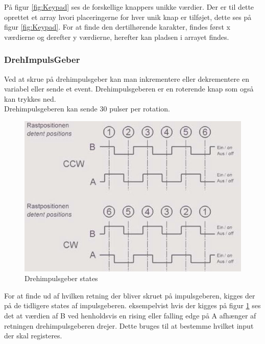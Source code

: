 På figur \ref{fig:Keypad} ses de forskellige knappers unikke værdier. Der er til dette oprettet et array hvori placeringerne for hver unik knap er tilføjet, dette ses på figur \ref{fig:Keypad}. For at finde den dertilhørende karakter, findes først x værdierne og derefter y værdierne, herefter kan pladsen i arrayet findes.
\\


\subsubsection{DrehImpulsGeber}

Ved at skrue på drehimpulsgeber kan man inkrementere eller dekrementere en variabel eller sende et event.
Drehimpulsgeberen er en roterende knap som også kan trykkes ned.\\
Drehimpulsgeberen kan sende 30 pulser per rotation.

\begin{figure}[ht]
			\begin{center}
			\includegraphics[scale=0.40]{Billeder/DrehImpulsGeber_events.JPG}
			\end{center}
			\caption{Drehimpulsgeber states}
			\label{fig:Impulsgeber}
		\end{figure}

For at finde ud af hvilken retning der bliver skruet på impulsgeberen, kigges der på de tidligere states af impulsgeberen.
eksempelvist hvis der kigges på figur \ref{fig:Impulsgeber} ses det at værdien af B ved henholdsvis en rising eller falling edge på A afhænger af retningen drehimpulsgeberen drejer. Dette bruges til at bestemme hvilket input der skal registeres.



